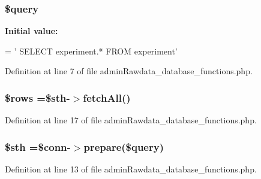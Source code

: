 \hypertarget{admin_batch_2admin_rawdata__database__functions_8php_af59a5f7cd609e592c41dc3643efd3c98}{
\subsubsection[{\$query}]{\setlength{\rightskip}{0pt plus 5cm}\$query}}\label{admin_batch_2admin_rawdata__database__functions_8php_af59a5f7cd609e592c41dc3643efd3c98}
{\bfseries Initial value\-:}
\begin{DoxyCode}
= \textcolor{stringliteral}{'}
\textcolor{stringliteral}{    SELECT }
\textcolor{stringliteral}{        experiment.*}
\textcolor{stringliteral}{    FROM }
\textcolor{stringliteral}{        experiment'}
\end{DoxyCode}


Definition at line 7 of file admin\-Rawdata\-\_\-database\-\_\-functions.\-php.

\hypertarget{admin_batch_2admin_rawdata__database__functions_8php_ace2ec39e7df3899fa8df9640ec274b03}{
\subsubsection[{\$rows}]{\setlength{\rightskip}{0pt plus 5cm}\$rows =\$sth-\/$>$fetch\-All()}}\label{admin_batch_2admin_rawdata__database__functions_8php_ace2ec39e7df3899fa8df9640ec274b03}


Definition at line 17 of file admin\-Rawdata\-\_\-database\-\_\-functions.\-php.

\hypertarget{admin_batch_2admin_rawdata__database__functions_8php_afa9126f9664959c02795be300a135f93}{
\subsubsection[{\$sth}]{\setlength{\rightskip}{0pt plus 5cm}\$sth =\$conn-\/$>$prepare(\$query)}}\label{admin_batch_2admin_rawdata__database__functions_8php_afa9126f9664959c02795be300a135f93}


Definition at line 13 of file admin\-Rawdata\-\_\-database\-\_\-functions.\-php.

